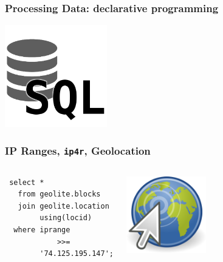 \documentclass{beamer}
\begin{document}
\begin{frame}[fragile]
  \frametitle{Processing Data: declarative programming}

  \vfill
  
    \begin{center}
      \includegraphics[height=12em]{sql.png}
    \end{center}
\end{frame}


\begin{frame}[fragile]
  \frametitle{IP Ranges, \texttt{ip4r}, Geolocation}

  \vfill

\begin{columns}
\begin{verbatim}
 select *
   from geolite.blocks
   join geolite.location
        using(locid)
  where iprange
            >>=
        '74.125.195.147';
\end{verbatim}
\begin{center}
  \includegraphics[height=9em]{geolocation-clic.png}
\end{center}
\end{columns}
\end{frame}
\end{document}
